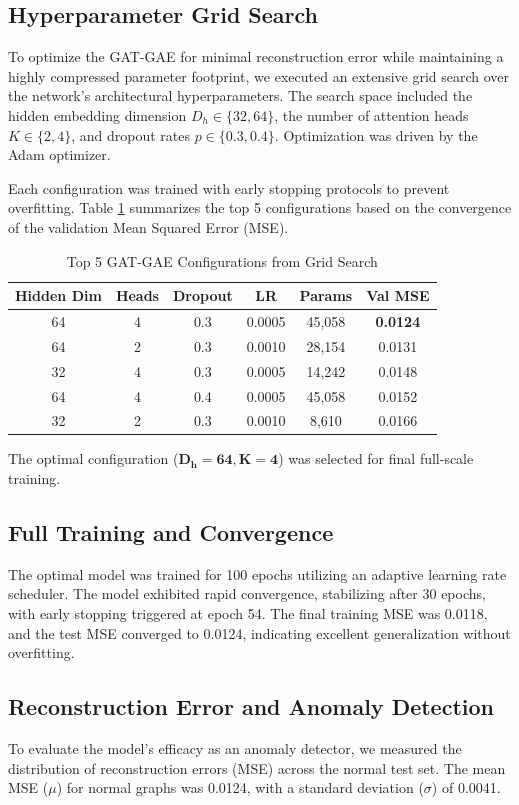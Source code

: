 \documentclass[conference, a4paper]{IEEEtran}
\begin{document}
\subsection{Hyperparameter Grid Search}
To optimize the GAT-GAE for minimal reconstruction error while maintaining a highly compressed parameter footprint, we executed an extensive grid search over the network's architectural hyperparameters. The search space included the hidden embedding dimension $D_h \in \{32, 64\}$, the number of attention heads $K \in \{2, 4\}$, and dropout rates $p \in \{0.3, 0.4\}$. Optimization was driven by the Adam optimizer.

Each configuration was trained with early stopping protocols to prevent overfitting. Table \ref{tab:grid_search} summarizes the top 5 configurations based on the convergence of the validation Mean Squared Error (MSE).

\begin{table}[H]
\centering
\caption{Top 5 GAT-GAE Configurations from Grid Search}
\label{tab:grid_search}
\begin{tabular}{@{}cccccc@{}}
\toprule
\textbf{Hidden Dim} & \textbf{Heads} & \textbf{Dropout} & \textbf{LR} & \textbf{Params} & \textbf{Val MSE} \\ \midrule
64 & 4 & 0.3 & 0.0005 & 45,058 & \textbf{0.0124} \\
64 & 2 & 0.3 & 0.0010 & 28,154 & 0.0131 \\
32 & 4 & 0.3 & 0.0005 & 14,242 & 0.0148 \\
64 & 4 & 0.4 & 0.0005 & 45,058 & 0.0152 \\
32 & 2 & 0.3 & 0.0010 & 8,610  & 0.0166 \\ \bottomrule
\end{tabular}
\end{table}

The optimal configuration ($\mathbf{D_h=64, K=4}$) was selected for final full-scale training.

\subsection{Full Training and Convergence}
The optimal model was trained for 100 epochs utilizing an adaptive learning rate scheduler. The model exhibited rapid convergence, stabilizing after 30 epochs, with early stopping triggered at epoch 54. The final training MSE was 0.0118, and the test MSE converged to 0.0124, indicating excellent generalization without overfitting.

\subsection{Reconstruction Error and Anomaly Detection}
To evaluate the model's efficacy as an anomaly detector, we measured the distribution of reconstruction errors (MSE) across the normal test set. The mean MSE ($\mu$) for normal graphs was 0.0124, with a standard deviation ($\sigma$) of 0.0041. 
\end{document}
